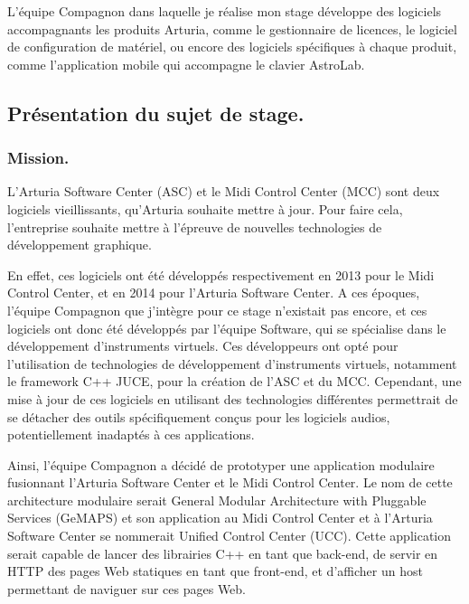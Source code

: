\documentclass[francais]{rapportPFE}  %
\begin{document}
L'équipe Compagnon dans laquelle je réalise mon stage développe des logiciels accompagnants les produits Arturia, comme le gestionnaire de licences, le logiciel de configuration de matériel, ou encore des logiciels spécifiques à chaque produit, comme l'application mobile qui accompagne le clavier AstroLab. 

\subsection{Présentation du sujet de stage.}


\subsubsection{Mission.}

L'Arturia Software Center (ASC) et le Midi Control Center (MCC) sont deux logiciels vieillissants, qu'Arturia souhaite mettre à jour. Pour faire cela, l'entreprise souhaite mettre à l'épreuve de nouvelles technologies de développement graphique.

En effet, ces logiciels ont été développés respectivement en 2013 pour le Midi Control Center, et en 2014 pour l'Arturia Software Center. A ces époques, l'équipe Compagnon que j'intègre pour ce stage n'existait pas encore, et ces logiciels ont donc été développés par l'équipe Software, qui se spécialise dans le développement d'instruments virtuels. Ces développeurs ont opté pour l'utilisation de technologies de développement d'instruments virtuels, notamment le framework C++ JUCE, pour la création de l'ASC et du MCC. Cependant, une mise à jour de ces logiciels en utilisant des technologies différentes permettrait de se détacher des outils spécifiquement conçus pour les logiciels audios, potentiellement inadaptés à ces applications.

Ainsi, l'équipe Compagnon a décidé de prototyper une application modulaire fusionnant l'Arturia Software Center et le Midi Control Center. Le nom de cette architecture modulaire serait General Modular Architecture with Pluggable Services (GeMAPS) et son application au Midi Control Center et à l'Arturia Software Center se nommerait Unified Control Center (UCC). Cette application serait capable de lancer des librairies C++ en tant que back-end, de servir en HTTP des pages Web statiques en tant que front-end, et d'afficher un host permettant de naviguer sur ces pages Web. 
\end{document}
